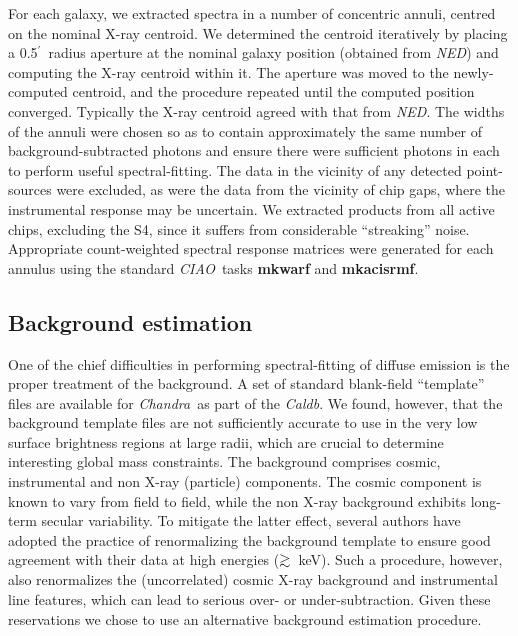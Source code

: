 \documentclass{emulateapj}
\def \arcmin {\hbox{$^\prime$}}
\def\spose#1{\hbox to 0pt{#1\hss}}
\def\gtsim{$\mathrel{\spose{\lower 3pt\hbox{$\sim$}} 
        \raise 2.0pt\hbox{$>$}}$\thinspace}
\newcommand{\chandra }{{\em Chandra}}
\newcommand{\ciao }{{\em CIAO}}
\newcommand{\caldb }{{\em Caldb}}
\newcommand{\ned}{{\em{NED}}}
\begin{document}
For each galaxy, we extracted spectra in a number
of concentric annuli, centred on the nominal X-ray centroid. We determined
the centroid iteratively by placing a 0.5\arcmin\ radius aperture at the nominal
galaxy position (obtained from \ned) and computing the X-ray centroid
within it. The aperture was moved to the newly-computed centroid, and the
procedure repeated until the computed position converged. Typically the
X-ray centroid agreed with that from \ned. The widths of
the annuli were chosen so as to contain approximately the same number of
background-subtracted photons and ensure there were sufficient photons in each
to perform useful spectral-fitting. The data in the vicinity of any
detected point-sources were excluded, as were the data from the vicinity
of chip gaps, where the instrumental response may be uncertain. We extracted
products from all active chips, excluding the S4, since it suffers from
considerable ``streaking'' noise. 
Appropriate count-weighted spectral response 
matrices were generated for each annulus 
using the standard \ciao\ tasks {\bf mkwarf} and {\bf mkacisrmf}.

\subsection{Background estimation} \label{sect_bkd}
One of the chief difficulties in performing spectral-fitting of 
diffuse emission is the proper treatment of the background.
A set of standard blank-field ``template'' files are available for
\chandra\ as part of the \caldb. We found, however, that 
the background template files are not sufficiently accurate to use 
in the very low surface brightness regions at large radii, which are
crucial to determine interesting global mass constraints.
The background comprises cosmic, instrumental and non X-ray
(particle) components.
The cosmic  component is known to vary  from field to field, while
the non X-ray background exhibits long-term secular variability.
To mitigate the latter effect, several authors have
adopted the practice of renormalizing the background
template to ensure good agreement with their data at high
energies (\gtsim 10~keV). Such a procedure, however, also
renormalizes the (uncorrelated) cosmic X-ray background and instrumental
line features, which can lead to serious over- or under-subtraction.
Given these reservations we chose to use an alternative
background estimation procedure.
\end{document}
